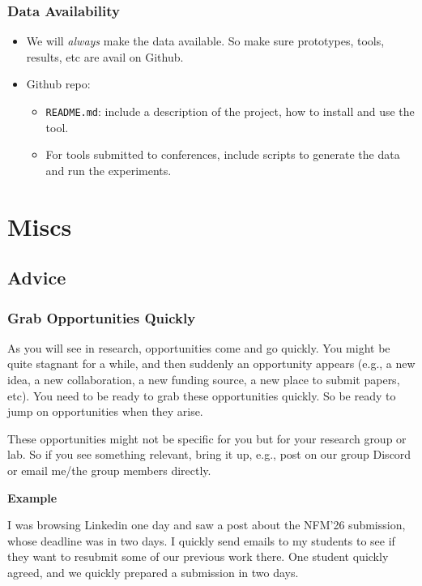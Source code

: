 \documentclass[oneside,11pt]{book}
\newenvironment{commentbox}[1][]{
  \small
  \begin{marker}[\faChessPawn{}]
    {\textbf{#1}}
  }{
  \end{marker}
}
\begin{document}
\section{Data Availability}
\begin{itemize}
\item We will \emph{always} make the data available. So make sure prototypes, tools, results, etc are avail on Github.
\item Github repo:
\begin{itemize}
\item \texttt{README.md}: include a description of the project, how to install and use the tool.
 \item For tools submitted to conferences, include scripts to generate the data and run the experiments.
\end{itemize}
\end{itemize}

\part{Miscs}

\chapter{Advice}

\section{Grab Opportunities Quickly} As you will see in research, opportunities come and go quickly. You might be quite stagnant for a while, and then suddenly an opportunity appears (e.g., a new idea, a new collaboration, a new funding source, a new place to submit papers, etc). You need to be ready to grab these opportunities quickly.  So be ready to jump on opportunities when they arise.

These opportunities might not be specific for you but for your research group or lab. So if you see something relevant, bring it up, e.g., post on our group Discord or email me/the group members directly.

\begin{commentbox}[Example]
    I was browsing Linkedin one day and saw a post about the NFM'26 submission, whose deadline was in two days. I quickly send emails to my students to see if they want to resubmit some of our previous work there. One student quickly agreed, and we quickly prepared a submission in two days.
  
\end{commentbox}  
\end{document}
